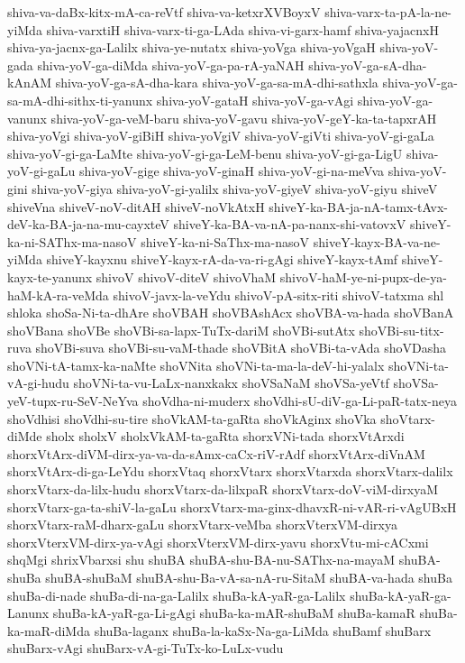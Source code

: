 {shiva-va-daBx-kitx-mA-ca-reVtf
shiva-va-ketxrXVBoyxV
shiva-varx-ta-pA-la-ne-yiMda
shiva-varxtiH
shiva-varx-ti-ga-LAda
shiva-vi-garx-hamf
shiva-yajacnxH
shiva-ya-jacnx-ga-Lalilx
shiva-ye-nutatx
shiva-yoVga
shiva-yoVgaH
shiva-yoV-gada
shiva-yoV-ga-diMda
shiva-yoV-ga-pa-rA-yaNAH
shiva-yoV-ga-sA-dha-kAnAM
shiva-yoV-ga-sA-dha-kara
shiva-yoV-ga-sa-mA-dhi-sathxla
shiva-yoV-ga-sa-mA-dhi-sithx-ti-yanunx
shiva-yoV-gataH
shiva-yoV-ga-vAgi
shiva-yoV-ga-vanunx
shiva-yoV-ga-veM-baru
shiva-yoV-gavu
shiva-yoV-geY-ka-ta-tapxrAH
shiva-yoVgi
shiva-yoV-giBiH
shiva-yoVgiV
shiva-yoV-giVti
shiva-yoV-gi-gaLa
shiva-yoV-gi-ga-LaMte
shiva-yoV-gi-ga-LeM-benu
shiva-yoV-gi-ga-LigU
shiva-yoV-gi-gaLu
shiva-yoV-gige
shiva-yoV-ginaH
shiva-yoV-gi-na-meVva
shiva-yoV-gini
shiva-yoV-giya
shiva-yoV-gi-yalilx
shiva-yoV-giyeV
shiva-yoV-giyu
shiveV
shiveVna
shiveV-noV-ditAH
shiveV-noVkAtxH
shiveY-ka-BA-ja-nA-tamx-tAvx-deV-ka-BA-ja-na-mu-cayxteV
shiveY-ka-BA-va-nA-pa-nanx-shi-vatovxV
shiveY-ka-ni-SAThx-ma-nasoV
shiveY-ka-ni-SaThx-ma-nasoV
shiveY-kayx-BA-va-ne-yiMda
shiveY-kayxnu
shiveY-kayx-rA-da-va-ri-gAgi
shiveY-kayx-tAmf
shiveY-kayx-te-yanunx
shivoV
shivoV-diteV
shivoVhaM
shivoV-haM-ye-ni-pupx-de-ya-haM-kA-ra-veMda
shivoV-javx-la-veYdu
shivoV-pA-sitx-riti
shivoV-tatxma
shl
shloka
shoSa-Ni-ta-dhAre
shoVBAH
shoVBAshAcx
shoVBA-va-hada
shoVBanA
shoVBana
shoVBe
shoVBi-sa-lapx-TuTx-dariM
shoVBi-sutAtx
shoVBi-su-titx-ruva
shoVBi-suva
shoVBi-su-vaM-thade
shoVBitA
shoVBi-ta-vAda
shoVDasha
shoVNi-tA-tamx-ka-naMte
shoVNita
shoVNi-ta-ma-la-deV-hi-yalalx
shoVNi-ta-vA-gi-hudu
shoVNi-ta-vu-LaLx-nanxkakx
shoVSaNaM
shoVSa-yeVtf
shoVSa-yeV-tupx-ru-SeV-NeYva
shoVdha-ni-muderx
shoVdhi-sU-diV-ga-Li-paR-tatx-neya
shoVdhisi
shoVdhi-su-tire
shoVkAM-ta-gaRta
shoVkAginx
shoVka
shoVtarx-diMde
sholx
sholxV
sholxVkAM-ta-gaRta
shorxVNi-tada
shorxVtArxdi
shorxVtArx-diVM-dirx-ya-va-da-sAmx-caCx-riV-rAdf
shorxVtArx-diVnAM
shorxVtArx-di-ga-LeYdu
shorxVtaq
shorxVtarx
shorxVtarxda
shorxVtarx-dalilx
shorxVtarx-da-lilx-hudu
shorxVtarx-da-lilxpaR
shorxVtarx-doV-viM-dirxyaM
shorxVtarx-ga-ta-shiV-la-gaLu
shorxVtarx-ma-ginx-dhavxR-ni-vAR-ri-vAgUBxH
shorxVtarx-raM-dharx-gaLu
shorxVtarx-veMba
shorxVterxVM-dirxya
shorxVterxVM-dirx-ya-vAgi
shorxVterxVM-dirx-yavu
shorxVtu-mi-cACxmi
shqMgi
shrixVbarxsi
shu
shuBA
shuBA-shu-BA-nu-SAThx-na-mayaM
shuBA-shuBa
shuBA-shuBaM
shuBA-shu-Ba-vA-sa-nA-ru-SitaM
shuBA-va-hada
shuBa
shuBa-di-nade
shuBa-di-na-ga-Lalilx
shuBa-kA-yaR-ga-Lalilx
shuBa-kA-yaR-ga-Lanunx
shuBa-kA-yaR-ga-Li-gAgi
shuBa-ka-mAR-shuBaM
shuBa-kamaR
shuBa-ka-maR-diMda
shuBa-laganx
shuBa-la-kaSx-Na-ga-LiMda
shuBamf
shuBarx
shuBarx-vAgi
shuBarx-vA-gi-TuTx-ko-LuLx-vudu
}
